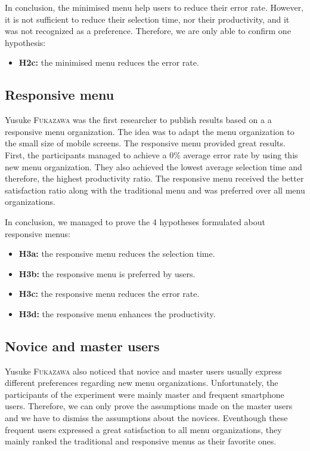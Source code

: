 In conclusion, the minimised menu help users to reduce their error rate. 
However, it is not sufficient to reduce their selection time, nor their 
productivity, and it was not recognized as a preference. Therefore, we are 
only able to confirm one hypothesis:

\begin{itemize}
 \item \textbf{H2c:} the minimised menu reduces the error rate.
\end{itemize}

\subsection{Responsive menu}
Yusuke \textsc{Fukazawa} was the first researcher to publish results based on a 
a responsive menu organization. The idea was to adapt the menu organization to 
the small size of mobile screens. The responsive menu provided great results. 
First, the participants managed to achieve a $0\%$ average error rate by using 
this new 
menu organization. They also achieved the lowest average selection time and 
therefore, the highest productivity ratio. The responsive menu received the 
better satisfaction ratio along with the traditional menu and was preferred 
over all menu organizations.\newline

In conclusion, we managed to prove the 4 hypotheses formulated about responsive 
menus:

\begin{itemize}
 \item \textbf{H3a:} the responsive menu reduces the selection time.
 \item \textbf{H3b:} the responsive menu is preferred by users.
 \item \textbf{H3c:} the responsive menu reduces the error rate.
 \item \textbf{H3d:} the responsive menu enhances the productivity.
\end{itemize}

\subsection{Novice and master users}
Yusuke \textsc{Fukazawa} also noticed that novice and master users usually 
express different preferences regarding new menu organizations. Unfortunately, 
the participants of the experiment were mainly master and frequent smartphone 
users. Therefore, we can only prove the assumptions made on the master 
users and we have to dismiss the assumptions about the novices. Eventhough 
these frequent users expressed a great satisfaction to all menu organizations, 
they mainly ranked the traditional and responsive menus as their favorite 
ones.\newline

